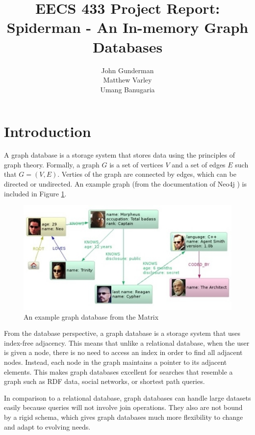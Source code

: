 \documentclass[11pt]{article}
\title{EECS 433 Project Report: Spiderman - An In-memory Graph Databases}
\author{John Gunderman\\
		Matthew Varley\\
		Umang Banugaria}
\date{}
\begin{document}
\maketitle
\tableofcontents

\section{Introduction}


A graph database is a storage system that stores data using the principles of graph theory. Formally, a graph $G$  is a set of vertices $V$ and a set of edges $E$ such that $G= (V,E)$. Verties of the graph are connected by edges, which can be directed or undirected. An example graph (from the documentation of Neo4j \cite{neo}) is included in Figure \ref{fig:graph}.

\begin{figure}[H]
\centering
\includegraphics[scale=0.7]{GraphDB.jpg}
\caption{An example graph database from the Matrix\cite{neo}}
\label{fig:graph}
\end{figure}

From the database perspective, a graph database is a storage system that uses index-free adjacency. This means that unlike a relational database, when the user is given a node, there is no need to access an index in order to find all adjacent nodes. Instead, each node in the graph maintains a pointer to its adjacent elements. This makes graph databases excellent for searches that resemble a graph such as RDF data, social networks, or shortest path queries.

In comparison to a relational database, graph databases can handle large datasets easily because queries will not involve join operations. They also are not bound by a rigid schema, which gives graph databases much more flexibility to change and adapt to evolving needs.
\end{document}
